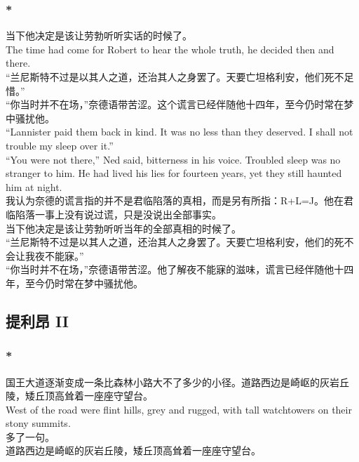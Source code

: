 \documentclass[12pt,a4paper]{article}
\newcommand{\h}[1]{{\color{red}#1}\\}
\newcommand{\la}[1]{{\color{blue}#1}\\}
\begin{document}
\subsubsection{\color{red}*}\la{
当下他决定是该让劳勃听听实话的时候了。\\
The time had come for Robert to hear the whole truth, he decided then and there. \\
“兰尼斯特不过是以其人之道，还治其人之身罢了。天要亡坦格利安，他们死不足惜。”\\“你当时并不在场，”奈德语带苦涩。这个谎言已经伴随他十四年，至今仍时常在梦中骚扰他。\\
“Lannister paid them back in kind. It was no less than they deserved. I shall not trouble my sleep over it.”\\“You were not there,” Ned said, bitterness in his voice. Troubled sleep was no stranger to him. He had lived his lies for fourteen years, yet they still haunted him at night.}\h{
我认为奈德的谎言指的并不是君临陷落的真相，而是另有所指：R+L=J。他在君临陷落一事上没有说过谎，只是没说出全部事实。}
当下他决定是该让劳勃听听当年的全部真相的时候了。\\
“兰尼斯特不过是以其人之道，还治其人之身罢了。天要亡坦格利安，他们的死不会让我夜不能寐。”\\“你当时并不在场，”奈德语带苦涩。他了解夜不能寐的滋味，谎言已经伴随他十四年，至今仍时常在梦中骚扰他。

\subsection{提利昂 II}
\subsubsection{\color{red}*}\la{
国王大道逐渐变成一条比森林小路大不了多少的小径。道路西边是崎岖的灰岩丘陵，矮丘顶高耸着一座座守望台。\\
West of the road were flint hills, grey and rugged, with tall watchtowers on their stony summits.}\h{
多了一句。}
道路西边是崎岖的灰岩丘陵，矮丘顶高耸着一座座守望台。
\end{document}
